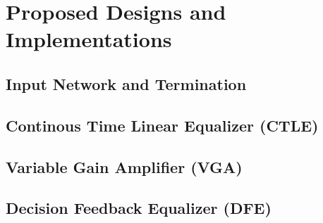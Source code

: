 \chapter{Proposed Designs and Implementations}
\label{Chapter8}

\section{Input Network and Termination}
 

\newpage
\section{Continous Time Linear Equalizer (CTLE)}
 

\newpage
\section{Variable Gain Amplifier (VGA)}
 

\newpage
\section{Decision Feedback Equalizer (DFE)}
 
